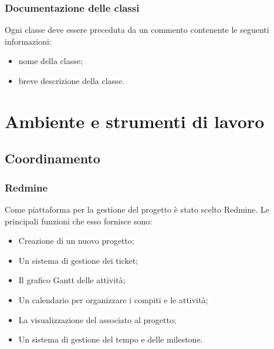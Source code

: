 \subsubsection{Documentazione delle classi}
\label{5.3.3}
Ogni classe deve essere preceduta da un commento contenente le seguenti informazioni:
\begin{itemize}
\item {} nome della classe;
\item {} breve descrizione della classe.
\end{itemize}



\newpage
\section{Ambiente e strumenti di lavoro}
\label{4.0}

\subsection{Coordinamento}
\label{}

\subsubsection{Redmine}
\label{4.1}
Come piattaforma per la gestione del progetto è stato scelto Redmine. Le principali funzioni che esso fornisce sono:
\begin{itemize}
\item Creazione di un nuovo progetto;
\item Un sistema di gestione dei ticket;
\item Il grafico Gantt delle attività;
\item Un calendario per organizzare i compiti e le attività;
\item La visualizzazione del  associato al progetto;
\item Un sistema di  gestione del tempo e delle milestone.
\end{itemize}



